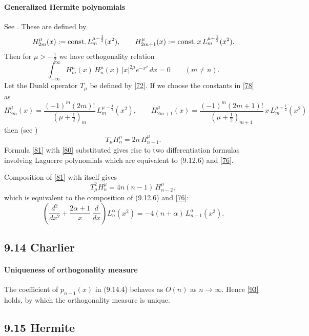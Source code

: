 \documentclass[twoside,11pt]{article}
\newcommand\al\alpha
\newcommand\half{\frac12}
\newcommand\thalf{\tfrac12}
\newcommand\iy\infty
\newcommand\const{{\rm const.}\,}
\begin{document}
\paragraph{Generalized Hermite polynomials}
See \cite[p.156]{146}.
These are defined by
\begin{equation}
H_{2m}^\mu(x):=\const L_m^{\mu-\half}(x^2),\qquad
H_{2m+1}^\mu(x):=\const x\,L_m^{\mu+\half}(x^2).
\label{78}
\end{equation}
Then for $\mu>-\thalf$ we have orthogonality relation
\begin{equation}
\int_{-\iy}^{\iy} H_m^\mu(x)\,H_n^\mu(x)\,|x|^{2\mu}e^{-x^2}\,dx
=0\qquad(m\ne n).
\label{79}
\end{equation}
Let the Dunkl operator $T_\mu$ be defined by \eqref{72}.
If we choose the constants in \eqref{78} as
\begin{equation}
H_{2m}^\mu(x)=\frac{(-1)^m(2m)!}{(\mu+\thalf)_m}\,L_m^{\mu-\half}(x^2),\qquad
H_{2m+1}^\mu(x)=\frac{(-1)^m(2m+1)!}{(\mu+\thalf)_{m+1}}\,
 x\,L_m^{\mu+\half}(x^2)
 \label{80}
\end{equation}
then (see \cite[(1.6)]{K5})
\begin{equation}
T_\mu H_n^\mu=2n\,H_{n-1}^\mu.
\label{81}
\end{equation}
Formula \eqref{81} with \eqref{80} substituted gives rise to two
differentiation formulas involving Laguerre polynomials which are equivalent to
(9.12.6) and \eqref{76}.

Composition of \eqref{81} with itself gives
\[
T_\mu^2 H_n^\mu=4n(n-1)\,H_{n-2}^\mu,
\]
which is equivalent to the composition of (9.12.6) and \eqref{76}:
\begin{equation}
\left(\frac{d^2}{dx^2}+\frac{2\al+1}x\,\frac d{dx}\right)L_n^\al(x^2)
=-4(n+\al)\,L_{n-1}^\al(x^2).
\label{82}
\end{equation}
%
\subsection*{9.14 Charlier}
%
\paragraph{Uniqueness of orthogonality measure}
The coefficient of $p_{n-1}(x)$ in (9.14.4) behaves as $O(n)$ as $n\to\iy$.
Hence \eqref{93} holds, by which the orthogonality measure is unique.
%
\subsection*{9.15 Hermite}
%
\end{document}
